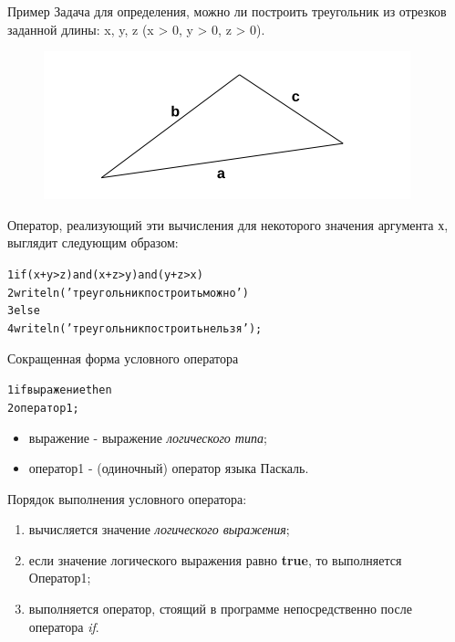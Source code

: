 \documentclass{beamer}
\begin{document}
\begin{frame}[fragile]{Пример}
Задача для определения, можно ли построить треугольник из отрезков заданной длины: x, y, z (x > 0, y  > 0, z > 0).
\begin{figure}[h]
\centering
\includegraphics[scale=0.5]{images/lec03-pic05.png}
\end{figure}
Оператор, реализующий эти вычисления для некоторого значения аргумента х, выглядит следующим образом:
\begin{alltt}
1  if (x +y > z) and (x +z > y) and (y +z > x)
2    writeln('треугольник построить можно')
3  else
4    writeln('треугольник построить нельзя');
\end{alltt}
\end{frame}

\begin{frame}[fragile]{Сокращенная форма условного оператора}
\begin{alltt}
1 if выражение then
2    оператор1;
\end{alltt}
\begin{itemize}
\item выражение - выражение \textit{логического типа};
\item оператор1 - (одиночный) оператор языка Паскаль.
\end{itemize}
Порядок выполнения условного оператора:
\begin{enumerate}
\item вычисляется значение \textit{логического выражения};
\item если значение логического выражения равно \textbf{true}, то выполняется Оператор1;
\item выполняется оператор, стоящий в программе непосредственно после оператора \textit{if}.
\end{enumerate}
\end{frame}
\end{document}
